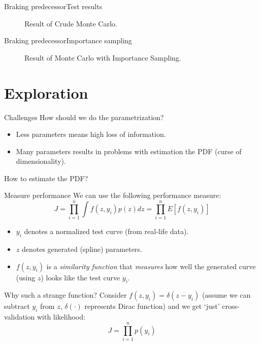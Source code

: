 \documentclass[aspectratio=\AspectR,10pt,compress,t]{beamer} %
\begin{document}
\begin{frame}{Braking predecessor}{Test results}
	\begin{figure}
		\centering
		
		\vspace{-0.5em}
		\caption{Result of Crude Monte Carlo.}
	\end{figure}
\end{frame}

\begin{frame}{Braking predecessor}{Importance sampling}
	\begin{figure}
		\centering
		
		\vspace{-0.5em}
		\caption{Result of Monte Carlo with Importance Sampling.}
	\end{figure}
\end{frame}

\section{Exploration}
\begin{frame}{Challenges}
	How should we do the parametrization?
	\begin{itemize}
		\item Less parameters means high loss of information.
		\item Many parameters results in problems with estimation the PDF (curse of dimensionality).
	\end{itemize}
	How to estimate the PDF?
	\pause
	\begin{figure}
		\centering
		
	\end{figure}
\end{frame}

\begin{frame}{Measure performance}
	We can use the following performance measure:
	\begin{equation}
		J = \prod_{i=1}^n \int f(z,y_i) p(z) dz = \prod_{i=1}^n E[f(z,y_i)]
	\end{equation}
	\begin{itemize}
		\item $y_i$ denotes a normalized test curve (from real-life data).
		\item $z$ denotes generated (spline) parameters.
		\item $f(z,y_i)$ is a \emph{similarity function} that \emph{measures} how well the generated curve (using $z$) looks like the test curve $y_i$.
	\end{itemize}
	\pause
	Why such a strange function? Consider $f(z,y_i) = \delta(z-y_i)$ (assume we can subtract $y_i$ from $z$, $\delta(\cdot)$ represents Dirac function) and we get `just' cross-validation with likelihood:
	\begin{equation}
		J = \prod_{i=1}^n p(y_i)
	\end{equation}
\end{frame}
\end{document}
